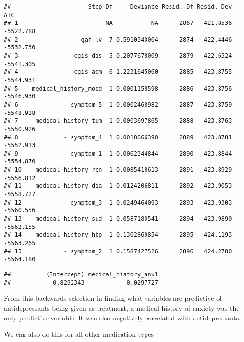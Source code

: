 \documentclass[
]{article}
\newenvironment{Shaded}{\begin{snugshade}}{\end{snugshade}}
\newcommand{\CommentTok}[1]{\textcolor[rgb]{0.56,0.35,0.01}{\textit{#1}}}
\newcommand{\NormalTok}[1]{#1}
\newcommand{\SpecialCharTok}[1]{\textcolor[rgb]{0.81,0.36,0.00}{\textbf{#1}}}
\begin{document}
\begin{verbatim}
##                      Step Df     Deviance Resid. Df Resid. Dev       AIC
## 1                         NA           NA      2867   421.8536 -5522.788
## 2                - gaf_lv  7 0.5910340004      2874   422.4446 -5532.730
## 3              - cgis_dis  5 0.2077678009      2879   422.6524 -5541.305
## 4              - cgis_adm  6 1.2231645060      2885   423.8755 -5544.931
## 5  - medical_history_mood  1 0.0001158598      2886   423.8756 -5546.930
## 6             - symptom_5  1 0.0002468982      2887   423.8759 -5548.928
## 7   - medical_history_tum  1 0.0003697865      2888   423.8763 -5550.926
## 8             - symptom_4  1 0.0018666390      2889   423.8781 -5552.913
## 9             - symptom_1  1 0.0062344844      2890   423.8844 -5554.870
## 10  - medical_history_ren  1 0.0085418613      2891   423.8929 -5556.812
## 11  - medical_history_dia  1 0.0124206811      2892   423.9053 -5558.727
## 12            - symptom_3  1 0.0249464093      2893   423.9303 -5560.556
## 13  - medical_history_sud  1 0.0587180541      2894   423.9890 -5562.155
## 14  - medical_history_hbp  1 0.1302869854      2895   424.1193 -5563.265
## 15            - symptom_2  1 0.1587427526      2896   424.2780 -5564.180
\end{verbatim}

\begin{Shaded}
\end{Shaded}

\begin{verbatim}
##          (Intercept) medical_history_anx1 
##            0.8292343           -0.0297727
\end{verbatim}

From this backwards selection in finding what variables are predictive
of antidepressants being given as treatment, a medical history of
anxiety was the only predictive variable. It was also negatively
correlated with antidepressants.

We can also do this for all other medication types
\end{document}
